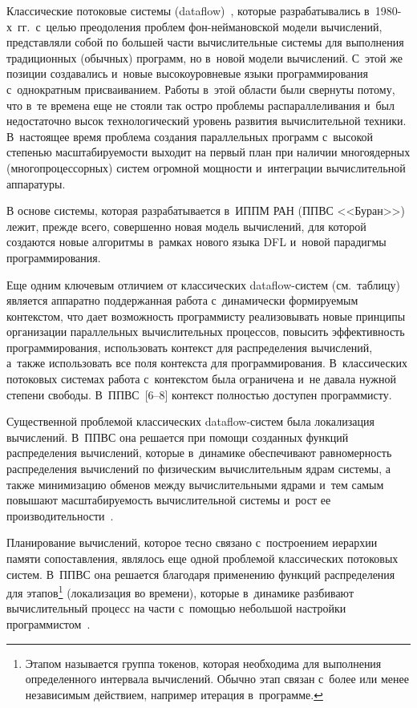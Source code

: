 \begin{multicols}{2}
  Классические потоковые системы (dataflow)~\cite{5-zm}, которые 
разрабатывались в~1980-х~гг.\ с~целью преодоления проблем  
фон-ней\-ма\-нов\-ской модели вычислений, представляли собой по большей 
части вычислительные системы для выполнения традиционных (обычных) 
программ, но в~новой модели вычислений. С~этой же позиции создавались 
и~новые высокоуровневые языки программирования с~однократным 
присваиванием. Работы в~этой области были свернуты потому, что в~те времена 
еще не стояли так остро проблемы распараллеливания и~был недостаточно 
высок технологический уровень развития вычислительной техники. 
В~настоящее время проблема создания параллельных программ с~высокой 
степенью масштабируемости выходит на первый план при наличии 
многоядерных (многопроцессорных) систем огромной мощности и~интеграции 
вычислительной аппаратуры.
  
  В основе системы, которая разрабатывается в~ИППМ РАН (ППВС 
  <<Буран>>) лежит, прежде всего, 
совершенно новая модель вычислений, для которой создаются новые 
алгоритмы в~рамках нового языка DFL и~новой парадигмы программирования.
  


  Еще одним ключевым отличием от классических dataflow-сис\-тем (см.\  
таб\-ли\-цу) является аппаратно поддержанная работа с~динамически 
формируемым контекстом, что дает возможность программи\-сту реализовывать 
новые принципы организации параллельных вычислительных процессов, 
повысить эффективность программирования, использовать контекст для 
распределения вы\-чис\-ле\-ний, а~также использовать все поля контекста для 
программирования. В~классических потоковых сис\-те\-мах работа с~контекстом 
была ограничена и~не давала нужной степени свободы. 
В~ППВС~[6--8] контекст 
полностью доступен программисту.
  
  Существенной проблемой классических dataflow-сис\-тем была локализация 
вычислений. В~ППВС она решается при помощи созданных функций 
распределения вычислений, которые в~динамике обеспечивают равномерность 
распределения вычислений по физическим вычислительным ядрам системы, а~
также минимизацию обменов между вычислительными ядрами и~тем самым 
повышают масштабируемость вычислительной сис\-те\-мы и~рост ее 
производительности~\cite{9-zm}.
  
  Планирование вычислений, которое тесно связано с~построением иерархии 
памяти сопоставления, являлось еще одной проблемой классических потоковых 
систем. В~ППВС она решается благодаря применению функций распределения 
для этапов\footnote{Этапом называется группа токенов, которая необходима для выполнения 
определенного интервала вычислений. Обычно этап связан с~более или менее независимым действием, 
например итерация в~программе.} (локализация во времени), которые в~динамике 
разбивают вычислительный процесс на час\-ти с~по\-мощью небольшой настройки 
программистом~\cite{10-zm}.
  

\end{multicols}
